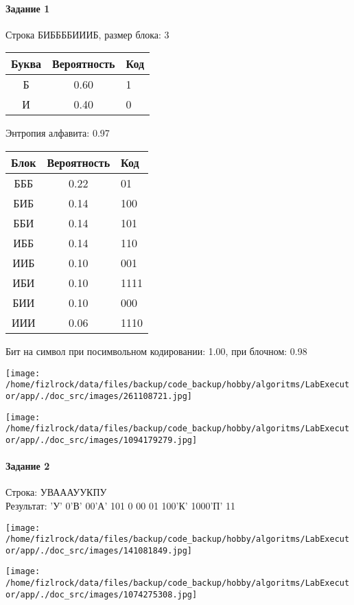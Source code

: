 \documentclass[a4paper, 12pt]{article}
\begin{document}
\paragraph{Задание 1}

Строка БИББББИИИБ, размер блока: 3
\begin{center}
 \begin{tabular}{ |c|c|l| } 
  \hline
     Буква & Вероятность & Код\\ \hline
Б & 0.60 & 1\\\hline
И & 0.40 & 0
\\ \hline \end{tabular}
\end{center}
Энтропия алфавита: 0.97
\begin{center}
 \begin{tabular}{ |c|c|l| } 
  \hline
     Блок & Вероятность & Код\\ \hline
БББ & 0.22 & 01\\\hline
БИБ & 0.14 & 100\\\hline
ББИ & 0.14 & 101\\\hline
ИББ & 0.14 & 110\\\hline
ИИБ & 0.10 & 001\\\hline
ИБИ & 0.10 & 1111\\\hline
БИИ & 0.10 & 000\\\hline
ИИИ & 0.06 & 1110
\\ \hline \end{tabular}
\end{center}
Бит на символ при посимвольном кодировании: 1.00, при блочном: 0.98

\texttt{[image: /home/fizlrock/data/files/backup/code\_backup/hobby/algoritms/LabExecutor/app/./doc\_src/images/261108721.jpg]}

\texttt{[image: /home/fizlrock/data/files/backup/code\_backup/hobby/algoritms/LabExecutor/app/./doc\_src/images/1094179279.jpg]}
\pagebreak
\paragraph{Задание 2}

Строка: 
УВАААУУКПУ\\
Результат: 'У' 0'В' 00'А' 101 0 00 01 100'К' 1000'П' 11

\texttt{[image: /home/fizlrock/data/files/backup/code\_backup/hobby/algoritms/LabExecutor/app/./doc\_src/images/141081849.jpg]}

\texttt{[image: /home/fizlrock/data/files/backup/code\_backup/hobby/algoritms/LabExecutor/app/./doc\_src/images/1074275308.jpg]}
\end{document}
